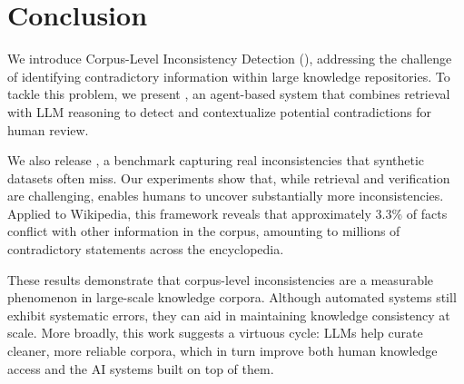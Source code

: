 \section{Conclusion}
\label{sec:conclusion}

We introduce Corpus-Level Inconsistency Detection (\task), addressing the challenge of identifying contradictory information within large knowledge repositories. To tackle this problem, we present \system, an agent-based system that combines retrieval with LLM reasoning to detect and contextualize potential contradictions for human review.

We also release \dataset, a benchmark capturing real inconsistencies that synthetic datasets often miss. Our experiments show that, while retrieval and verification are challenging, \system enables humans to uncover substantially more inconsistencies. Applied to Wikipedia, this framework reveals that approximately 3.3\% of facts conflict with other information in the corpus, amounting to millions of contradictory statements across the encyclopedia.

These results demonstrate that corpus-level inconsistencies are a measurable phenomenon in large-scale knowledge corpora. Although automated systems still exhibit systematic errors, they can aid in maintaining knowledge consistency at scale. More broadly, this work suggests a virtuous cycle: LLMs help curate cleaner, more reliable corpora, which in turn improve both human knowledge access and the AI systems built on top of them.
